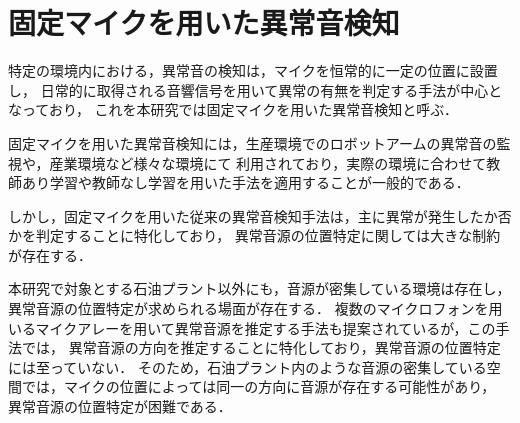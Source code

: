\documentclass[../main]{subfiles}
\begin{document}
\section{固定マイクを用いた異常音検知}
\label{sec:intro_my_purpose}
特定の環境内における，異常音の検知は，マイクを恒常的に一定の位置に設置し，
日常的に取得される音響信号を用いて異常の有無を判定する手法が中心となっており，
これを本研究では固定マイクを用いた異常音検知と呼ぶ．


固定マイクを用いた異常音検知には，生産環境でのロボットアームの異常音の監視や，産業環境など様々な環境にて
利用されており，実際の環境に合わせて教師あり学習や教師なし学習を用いた手法を適用することが一般的である．

しかし，固定マイクを用いた従来の異常音検知手法は，主に異常が発生したか否かを判定することに特化しており，
異常音源の位置特定に関しては大きな制約が存在する．

本研究で対象とする石油プラント以外にも，音源が密集している環境は存在し，異常音源の位置特定が求められる場面が存在する．
複数のマイクロフォンを用いるマイクアレーを用いて異常音源を推定する手法も提案されているが，この手法では，
異常音源の方向を推定することに特化しており，異常音源の位置特定には至っていない．
そのため，石油プラント内のような音源の密集している空間では，マイクの位置によっては同一の方向に音源が存在する可能性があり，
異常音源の位置特定が困難である．
\end{document}
